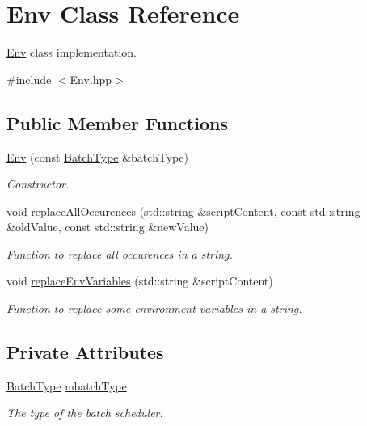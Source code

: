 \hypertarget{classEnv}{
\section{Env Class Reference}
\label{classEnv}
}


\hyperlink{classEnv}{Env} class implementation.  




{\ttfamily \#include $<$Env.hpp$>$}

\subsection*{Public Member Functions}
\begin{DoxyCompactItemize}
\item 
\hyperlink{classEnv_af79a38d660d0c8854858075a529fa8c8}{Env} (const \hyperlink{utilVishnu_8hpp_a864d748e7097d176552dd4c7635016ea}{BatchType} \&batchType)
\begin{DoxyCompactList}\small\item\em Constructor. \item\end{DoxyCompactList}\item 
void \hyperlink{classEnv_ae392272deae068e7f74d0ae26231acb2}{replaceAllOccurences} (std::string \&scriptContent, const std::string \&oldValue, const std::string \&newValue)
\begin{DoxyCompactList}\small\item\em Function to replace all occurences in a string. \item\end{DoxyCompactList}\item 
void \hyperlink{classEnv_abe12e01f5012827ca1a6fb635a613367}{replaceEnvVariables} (std::string \&scriptContent)
\begin{DoxyCompactList}\small\item\em Function to replace some environment variables in a string. \item\end{DoxyCompactList}\end{DoxyCompactItemize}
\subsection*{Private Attributes}
\begin{DoxyCompactItemize}
\item 
\hypertarget{classEnv_aac9ecb5744db70ede791ee6312526be2}{
\hyperlink{utilVishnu_8hpp_a864d748e7097d176552dd4c7635016ea}{BatchType} \hyperlink{classEnv_aac9ecb5744db70ede791ee6312526be2}{mbatchType}}
\label{classEnv_aac9ecb5744db70ede791ee6312526be2}

\begin{DoxyCompactList}\small\item\em The type of the batch scheduler. \item\end{DoxyCompactList}\end{DoxyCompactItemize}


